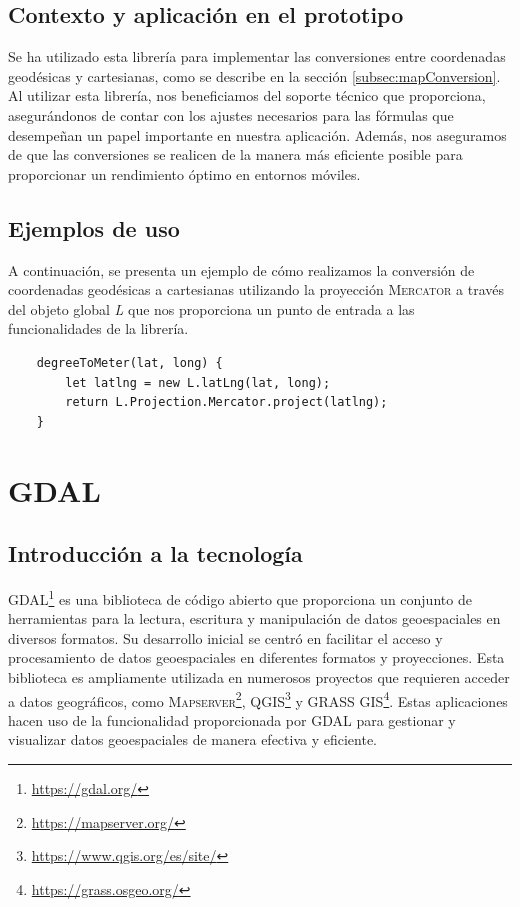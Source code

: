 \documentclass[a4paper, 11pt]{book}
\begin{document}
\subsection{Contexto y aplicación en el prototipo}
Se ha utilizado esta librería para implementar las conversiones entre coordenadas geodésicas y cartesianas, como se describe en la sección \ref{subsec:mapConversion}. Al utilizar esta librería, nos beneficiamos del soporte técnico que proporciona, asegurándonos de contar con los ajustes necesarios para las fórmulas que desempeñan un papel importante en nuestra aplicación. Además, nos aseguramos de que las conversiones se realicen de la manera más eficiente posible para proporcionar un rendimiento óptimo en entornos móviles.
\subsection{Ejemplos de uso}
A continuación, se presenta un ejemplo de cómo realizamos la conversión de coordenadas geodésicas a cartesianas utilizando la proyección \textsc{Mercator} a través del objeto global \emph{L} que nos proporciona un punto de entrada a las funcionalidades de la librería.
\begin{verbatim}
	degreeToMeter(lat, long) {
		let latlng = new L.latLng(lat, long);
		return L.Projection.Mercator.project(latlng);
	}
\end{verbatim}
\section{GDAL}
\subsection{Introducción a la tecnología}
\textsc{GDAL}\footnote{\url{https://gdal.org/}} es una biblioteca de código abierto que proporciona un conjunto de herramientas para la lectura, escritura y manipulación de datos geoespaciales en diversos formatos. Su desarrollo inicial se centró en facilitar el acceso y procesamiento de datos geoespaciales en diferentes formatos y proyecciones.
Esta biblioteca es ampliamente utilizada en numerosos proyectos que requieren acceder a datos geográficos, como \textsc{Mapserver}\footnote{\url{https://mapserver.org/}}, \textsc{QGIS}\footnote{\url{https://www.qgis.org/es/site/}} y \textsc{GRASS GIS}\footnote{\url{https://grass.osgeo.org/}}. Estas aplicaciones hacen uso de la funcionalidad proporcionada por \textsc{GDAL} para gestionar y visualizar datos geoespaciales de manera efectiva y eficiente.
\end{document}

